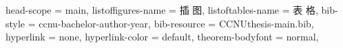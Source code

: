 {{      %
    head-scope = main,
    listoffigures-name = {插 \quad 图},
    listoftables-name  = {表 \quad 格},
    bib-style = ccnu-bachelor-author-year,
    bib-resource = {CCNUthesis-main.bib},
    hyperlink = none,
    hyperlink-color = default,
    theorem-bodyfont = normal,
  }
}


